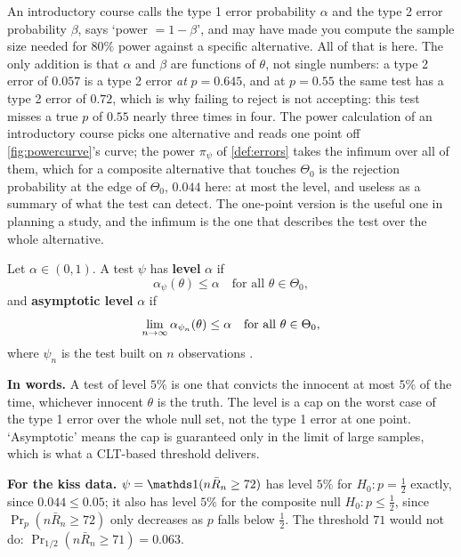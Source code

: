 \begin{bridge}
An introductory course calls the type 1 error probability $\alpha$ and the type 2 error probability $\beta$, says `power $= 1 - \beta$', and may have made you compute the sample size needed for $80\%$ power against a specific alternative.
All of that is here. The only addition is that $\alpha$ and $\beta$ are functions of $\theta$, not single numbers: a type 2 error of $0.057$ is a type 2 error \textit{at} $p = 0.645$, and at $p = 0.55$ the same test has a type 2 error of $0.72$, which is why failing to reject is not accepting: this test misses a true $p$ of $0.55$ nearly three times in four.
The power calculation of an introductory course picks one alternative and reads one point off \cref{fig:powercurve}'s curve; the power $\pi_\psi$ of \cref{def:errors} takes the infimum over all of them, which for a composite alternative that touches $\Theta_0$ is the rejection probability at the edge of $\Theta_0$, $0.044$ here: at most the level, and useless as a summary of what the test can detect. The one-point version is the useful one in planning a study, and the infimum is the one that describes the test over the whole alternative.
\end{bridge}

\begin{definition}
\label{def:level}
Let $\alpha \in (0, 1)$.
A test $\psi$ has \textbf{level} $\alpha$ if
\[
\alpha_\psi(\theta) \leq \alpha \quad \text{for all } \theta \in \Theta_0,
\]
and \textbf{asymptotic level} $\alpha$ if
\[
\lim_{n \to \infty} \alpha_{\psi_n}(\theta) \leq \alpha \quad \text{for all } \theta \in \Theta_0,
\]
where $\psi_n$ is the test built on $n$ observations .
\end{definition}

\begin{inwords}
\textbf{In words.} A test of level $5\%$ is one that convicts the innocent at most $5\%$ of the time, whichever innocent $\theta$ is the truth. The level is a cap on the worst case of the type 1 error over the whole null set, not the type 1 error at one point. `Asymptotic' means the cap is guaranteed only in the limit of large samples, which is what a CLT-based threshold delivers.
\par\smallskip
\textbf{For the kiss data.} $\psi = \ind(n\bar{R}_n \geq 72)$ has level $5\%$ for $H_0: p = \frac12$ exactly, since $0.044 \leq 0.05$; it also has level $5\%$ for the composite null $H_0: p \leq \frac12$, since $\Pr_p(n\bar{R}_n \geq 72)$ only decreases as $p$ falls below $\frac12$. The threshold $71$ would not do: $\Pr_{1/2}(n\bar{R}_n \geq 71) = 0.063$.
\end{inwords}

